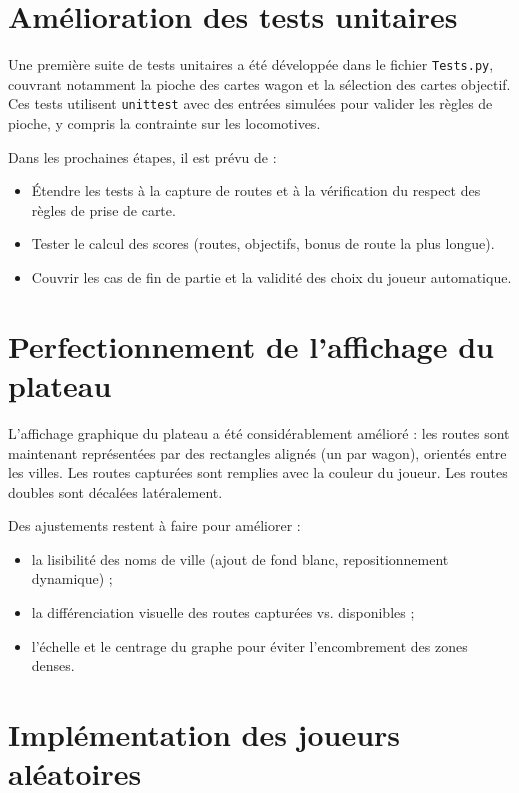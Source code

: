 \documentclass[a4paper,12pt]{report}
\begin{document}
\section*{Amélioration des tests unitaires}

Une première suite de tests unitaires a été développée dans le fichier \texttt{Tests.py}, couvrant notamment la pioche des cartes wagon et la sélection des cartes objectif. Ces tests utilisent \texttt{unittest} avec des entrées simulées pour valider les règles de pioche, y compris la contrainte sur les locomotives.

Dans les prochaines étapes, il est prévu de :
\begin{itemize}
    \item Étendre les tests à la capture de routes et à la vérification du respect des règles de prise de carte.
    \item Tester le calcul des scores (routes, objectifs, bonus de route la plus longue).
    \item Couvrir les cas de fin de partie et la validité des choix du joueur automatique.
\end{itemize}

\section*{Perfectionnement de l’affichage du plateau}

L'affichage graphique du plateau a été considérablement amélioré : les routes sont maintenant représentées par des rectangles alignés (un par wagon), orientés entre les villes. Les routes capturées sont remplies avec la couleur du joueur. Les routes doubles sont décalées latéralement.

Des ajustements restent à faire pour améliorer :
\begin{itemize}
    \item la lisibilité des noms de ville (ajout de fond blanc, repositionnement dynamique) ;
    \item la différenciation visuelle des routes capturées vs. disponibles ;
    \item l’échelle et le centrage du graphe pour éviter l'encombrement des zones denses.
\end{itemize}

\section*{Implémentation des joueurs aléatoires}
\end{document}
